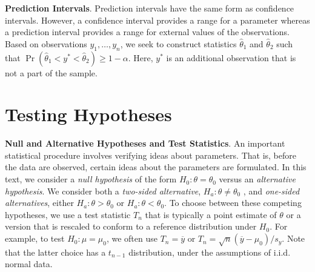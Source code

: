 \textbf{Prediction Intervals}. Prediction intervals have the same
form as confidence intervals. However, a confidence interval
provides a range for a parameter whereas a prediction interval
provides a range for external values of the observations. Based on
observations $y_1,\ldots,y_n$, we seek to construct statistics
$\widehat{\theta }_1$ and $\widehat{\theta }_{2}$ such that \newline
$\Pr \left( \widehat{\theta }_1<y^{\ast }<\widehat{\theta
}_{2}\right) \geq 1-\alpha .$ Here, $y^{\ast }$ is an additional
observation that is not a part of the sample.

\section{Testing Hypotheses}

\textbf{Null and Alternative Hypotheses and Test Statistics}. An
important statistical procedure involves verifying ideas about
parameters. That is, before the data are observed, certain ideas
about the parameters are formulated. In this text, we consider a
\emph{null hypothesis} of the form $ H_0:\theta =\theta_0$ versus an
\emph{alternative hypothesis}. We consider both a \emph{two-sided
alternative}, $H_{a}:\theta \neq \theta_0$ , and \emph{one-sided
alternatives}, either $H_{a}:\theta >\theta_0$ or $ H_{a}:\theta
<\theta_0$. To choose between these competing hypotheses, we use a
test statistic $T_n$ that is typically a point estimate of $\theta $
or a version that is rescaled to conform to a reference distribution
under $ H_0$. For example, to test $H_0:\mu =\mu_0$, we often use
$T_n= \overline{y}$ or $T_n=\sqrt{n}\left( \overline{y}-\mu_0\right)
/s_y$. Note that the latter choice has a $t_{n-1}$ distribution,
under the assumptions of i.i.d. normal data.



